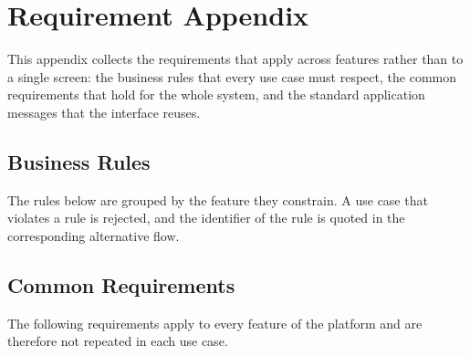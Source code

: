 \section{Requirement Appendix}

This appendix collects the requirements that apply across features rather than to a single screen: the business rules that every use case must respect, the common requirements that hold for the whole system, and the standard application messages that the interface reuses.

\subsection{Business Rules}

The rules below are grouped by the feature they constrain. A use case that violates a rule is rejected, and the identifier of the rule is quoted in the corresponding alternative flow.

\setcounter{table}{5}


\subsection{Common Requirements}

The following requirements apply to every feature of the platform and are therefore not repeated in each use case.

